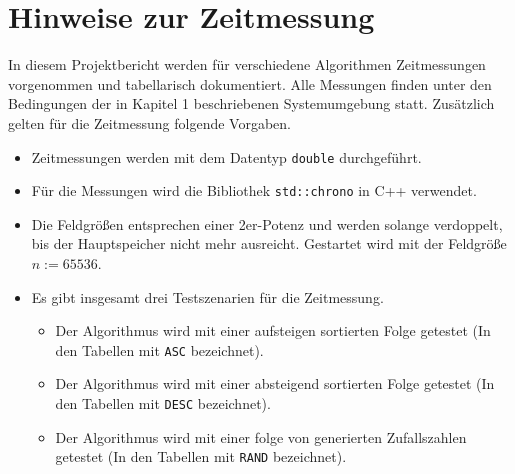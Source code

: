 \section{Hinweise zur Zeitmessung}

In diesem Projektbericht werden für verschiedene Algorithmen Zeitmessungen vorgenommen und tabellarisch dokumentiert. Alle Messungen finden unter den Bedingungen der in Kapitel 1 beschriebenen Systemumgebung statt. Zusätzlich gelten für die Zeitmessung folgende Vorgaben.

\begin{itemize}
	\item Zeitmessungen werden mit dem Datentyp \texttt{double} durchgeführt.
	\item Für die Messungen wird die Bibliothek \texttt{std::chrono} in C++ verwendet.
	\item Die Feldgrößen entsprechen einer 2er-Potenz und werden solange verdoppelt, bis der Hauptspeicher nicht mehr ausreicht. Gestartet wird mit der Feldgröße  $n := 65536$.
	\item Es gibt insgesamt drei Testszenarien für die Zeitmessung.
	\begin{itemize}
		\item Der Algorithmus wird mit einer aufsteigen sortierten Folge getestet (In den Tabellen mit \texttt{ASC} bezeichnet).
		\item Der Algorithmus wird mit einer absteigend sortierten Folge getestet (In den Tabellen mit \texttt{DESC} bezeichnet).
		\item Der Algorithmus wird mit einer folge von generierten Zufallszahlen getestet (In den Tabellen mit \texttt{RAND} bezeichnet).
	\end{itemize}
\end{itemize}